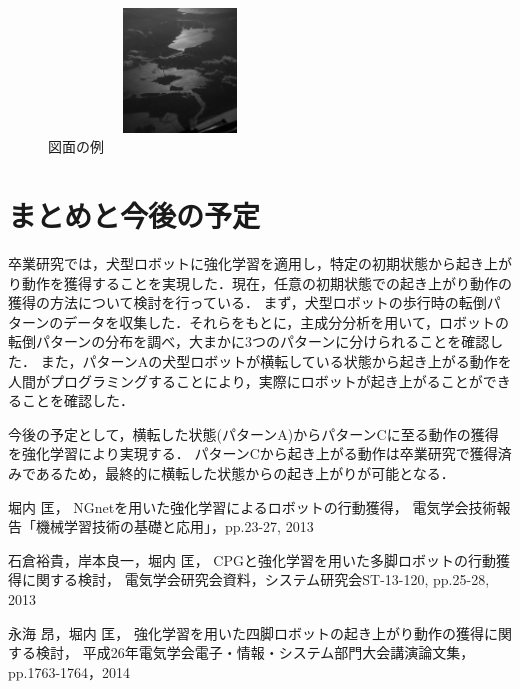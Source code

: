 \documentclass{jarticle}
\begin{document}
\begin{figure}[!b]
  \begin{center}
   \includegraphics[height=33mm,width=70mm]{Fig/Fig1.eps}
   \vspace*{-4mm}
   \caption{図面の例}
   \label{robot}
  \end{center}
\end{figure}

\vspace*{-2mm}
\section{まとめと今後の予定}

卒業研究では，犬型ロボットに強化学習を適用し，特定の初期状態から起き上がり動作を獲得することを実現した．現在，任意の初期状態での起き上がり動作の獲得の方法について検討を行っている．
まず，犬型ロボットの歩行時の転倒パターンのデータを収集した．それらをもとに，主成分分析を用いて，ロボットの転倒パターンの分布を調べ，大まかに3つのパターンに分けられることを確認した．
また，パターンAの犬型ロボットが横転している状態から起き上がる動作を人間がプログラミングすることにより，実際にロボットが起き上がることができることを確認した．

今後の予定として，横転した状態(パターンA)からパターンCに至る動作の獲得を強化学習により実現する．
パターンCから起き上がる動作は卒業研究で獲得済みであるため，最終的に横転した状態からの起き上がりが可能となる．

\begin{thebibliography}{99}

堀内 匡，
NGnetを用いた強化学習によるロボットの行動獲得，
電気学会技術報告「機械学習技術の基礎と応用」，pp.23-27, 2013

石倉裕貴，岸本良一，堀内 匡，
CPGと強化学習を用いた多脚ロボットの行動獲得に関する検討，
電気学会研究会資料，システム研究会ST-13-120, pp.25-28, 2013

永海 昂，堀内 匡，
強化学習を用いた四脚ロボットの起き上がり動作の獲得に関する検討，
平成26年電気学会電子・情報・システム部門大会講演論文集，pp.1763-1764，2014

\end{thebibliography}
\end{document}
